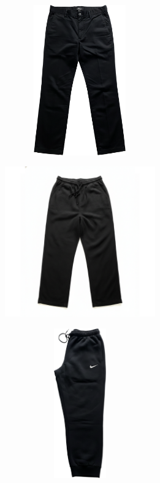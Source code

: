 \documentclass[10pt]{article}
\begin{document}
\begin{minipage}[c][64.75mm][c]{64.75mm}\centering
\includegraphics[width=64.75mm,height=64.75mm,keepaspectratio]{assets/pants/black-cotton-pants.png}\
\end{minipage} \hspace*{6.00mm} \begin{minipage}[c][64.75mm][c]{64.75mm}\centering
\includegraphics[width=64.75mm,height=64.75mm,keepaspectratio]{assets/pants/black-linen-pants.png}\
\end{minipage} \hspace*{6.00mm} \begin{minipage}[c][64.75mm][c]{64.75mm}\centering
\includegraphics[width=64.75mm,height=64.75mm,keepaspectratio]{assets/pants/black-nike-soft-pants.png}\
\end{minipage}\
\newpage
\end{document}
